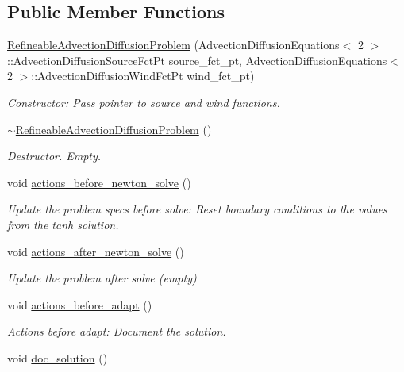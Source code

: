 \subsection*{Public Member Functions}
\begin{DoxyCompactItemize}
\item 
\hyperlink{classRefineableAdvectionDiffusionProblem_a515147bf0907ad339811955edb89817c}{Refineable\+Advection\+Diffusion\+Problem} (Advection\+Diffusion\+Equations$<$ 2 $>$\+::Advection\+Diffusion\+Source\+Fct\+Pt source\+\_\+fct\+\_\+pt, Advection\+Diffusion\+Equations$<$ 2 $>$\+::Advection\+Diffusion\+Wind\+Fct\+Pt wind\+\_\+fct\+\_\+pt)
\begin{DoxyCompactList}\small\item\em Constructor\+: Pass pointer to source and wind functions. \end{DoxyCompactList}\item 
\hyperlink{classRefineableAdvectionDiffusionProblem_ae746646f6c255dca13e5abe9fcf85fe3}{$\sim$\+Refineable\+Advection\+Diffusion\+Problem} ()
\begin{DoxyCompactList}\small\item\em Destructor. Empty. \end{DoxyCompactList}\item 
void \hyperlink{classRefineableAdvectionDiffusionProblem_a7cbcaa45fd7e932f335cc07a83b4d3e2}{actions\+\_\+before\+\_\+newton\+\_\+solve} ()
\begin{DoxyCompactList}\small\item\em Update the problem specs before solve\+: Reset boundary conditions to the values from the tanh solution. \end{DoxyCompactList}\item 
void \hyperlink{classRefineableAdvectionDiffusionProblem_a949296e60bc661fbd523974055a93f8b}{actions\+\_\+after\+\_\+newton\+\_\+solve} ()
\begin{DoxyCompactList}\small\item\em Update the problem after solve (empty) \end{DoxyCompactList}\item 
void \hyperlink{classRefineableAdvectionDiffusionProblem_a3470a408c458e5500ac614b8f0e65634}{actions\+\_\+before\+\_\+adapt} ()
\begin{DoxyCompactList}\small\item\em Actions before adapt\+: Document the solution. \end{DoxyCompactList}\item 
void \hyperlink{classRefineableAdvectionDiffusionProblem_a735d7fdd587d4730ffe1113b11ca3b56}{doc\+\_\+solution} ()

\end{DoxyCompactItemize}

